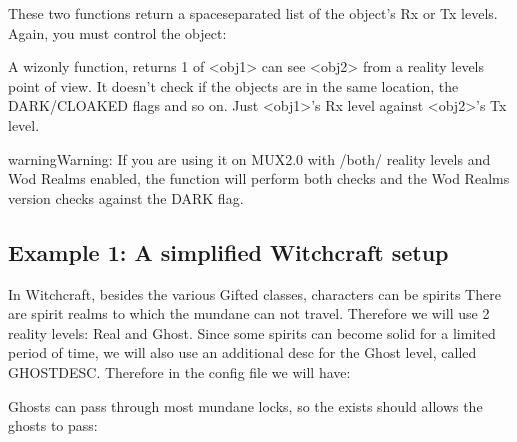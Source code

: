 \documentclass[letterpaper,10pt,english]{sphinxmanual}
\begin{document}
\sphinxAtStartPar
These two functions return a space\sphinxhyphen{}separated list of the object’s Rx or Tx
levels. Again, you must control the object:

\begin{sphinxVerbatim}[commandchars=\\\{\}]
\end{sphinxVerbatim}

\sphinxAtStartPar
A wiz\sphinxhyphen{}only function, returns 1 of \textless{}obj1\textgreater{} can see \textless{}obj2\textgreater{} from a reality
levels point of view. It doesn’t check if the objects are in the same
location, the DARK/CLOAKED flags and so on. Just \textless{}obj1\textgreater{}’s Rx level against
\textless{}obj2\textgreater{}’s Tx level.

\begin{sphinxadmonition}{warning}{Warning:}
\sphinxAtStartPar
If you are using it on MUX2.0 with /both/ reality levels and Wod
Realms enabled, the function will perform both checks and the Wod Realms
version checks against the DARK flag.
\end{sphinxadmonition}


\subsection{Example 1: A simplified Witchcraft setup}
\label{\detokenize{advanced:example-1-a-simplified-witchcraft-setup}}
\sphinxAtStartPar
In Witchcraft, besides the various Gifted classes, characters can be spirits
There are spirit realms to which the mundane can not travel. Therefore we
will use 2 reality levels: Real and Ghost. Since some spirits can become
solid for a limited period of time, we will also use an additional desc for
the Ghost level, called GHOSTDESC. Therefore in the config file we will
have:

\begin{sphinxVerbatim}[commandchars=\\\{\}]
  
   
\end{sphinxVerbatim}

\sphinxAtStartPar
Ghosts can pass through most mundane locks, so the exists should allows the
ghosts to pass:

\begin{sphinxVerbatim}[commandchars=\\\{\}]
 
\end{sphinxVerbatim}
\end{document}
